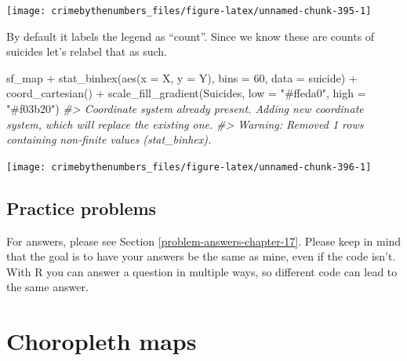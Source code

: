 \documentclass[
]{krantz}
\makeatletter
\newenvironment{Shaded}{\begin{snugshade}}{\end{snugshade}}
\newcommand{\AttributeTok}[1]{\textcolor[rgb]{0.61,0.61,0.61}{#1}}
\newcommand{\CommentTok}[1]{\textcolor[rgb]{0.37,0.37,0.37}{\textit{#1}}}
\newcommand{\DecValTok}[1]{\textcolor[rgb]{0.06,0.06,0.06}{#1}}
\newcommand{\FunctionTok}[1]{\textcolor[rgb]{0,0,0}{#1}}
\newcommand{\NormalTok}[1]{#1}
\newcommand{\SpecialCharTok}[1]{\textcolor[rgb]{0,0,0}{#1}}
\newcommand{\StringTok}[1]{\textcolor[rgb]{0.5,0.5,0.5}{#1}}
\newenvironment{kframe}{%
\medskip{}
\setlength{\fboxsep}{.8em}
 \def\at@end@of@kframe{}%
 \ifinner\ifhmode%
  \def\at@end@of@kframe{\end{minipage}}%
  \begin{minipage}{\columnwidth}%
 \fi\fi%
 \def\FrameCommand##1{\hskip\@totalleftmargin \hskip-\fboxsep
 \colorbox{shadecolor}{##1}\hskip-\fboxsep
     \hskip-\linewidth \hskip-\@totalleftmargin \hskip\columnwidth}%
 \MakeFramed {\advance\hsize-\width
   \@totalleftmargin\z@ \linewidth\hsize
   \@setminipage}}%
 {\par\unskip\endMakeFramed%
 \at@end@of@kframe}
\renewenvironment{Shaded}{\begin{kframe}}{\end{kframe}}
\makeatother
\begin{document}
\begin{center}\texttt{[image: crimebythenumbers\_files/figure-latex/unnamed-chunk-395-1]} \end{center}

By default it labels the legend as ``count''. Since we know these are counts of suicides let's relabel that as such.

\begin{Shaded}
\begin{Highlighting}[]
\NormalTok{sf\_map }\SpecialCharTok{+}
  \FunctionTok{stat\_binhex}\NormalTok{(}\FunctionTok{aes}\NormalTok{(}\AttributeTok{x =}\NormalTok{ X, }\AttributeTok{y =}\NormalTok{ Y),}
              \AttributeTok{bins  =} \DecValTok{60}\NormalTok{,}
              \AttributeTok{data =}\NormalTok{ suicide) }\SpecialCharTok{+}
  \FunctionTok{coord\_cartesian}\NormalTok{() }\SpecialCharTok{+}
  \FunctionTok{scale\_fill\_gradient}\NormalTok{(}\StringTok{\textquotesingle{}Suicides\textquotesingle{}}\NormalTok{,}
                      \AttributeTok{low =} \StringTok{"\#ffeda0"}\NormalTok{,}
                      \AttributeTok{high =} \StringTok{"\#f03b20"}\NormalTok{)}
\CommentTok{\#\textgreater{} Coordinate system already present. Adding new coordinate system, which will replace the existing one.}
\CommentTok{\#\textgreater{} Warning: Removed 1 rows containing non{-}finite values (stat\_binhex).}
\end{Highlighting}
\end{Shaded}

\begin{center}\texttt{[image: crimebythenumbers\_files/figure-latex/unnamed-chunk-396-1]} \end{center}

\hypertarget{practice-problems-10}{%
\section{Practice problems}\label{practice-problems-10}}

For answers, please see Section \ref{problem-answers-chapter-17}. Please keep in mind that the goal is to have your answers be the same as mine, even if the code isn't. With R you can answer a question in multiple ways, so different code can lead to the same answer.

\hypertarget{choropleth-maps}{%
\chapter{Choropleth maps}\label{choropleth-maps}}
\end{document}
